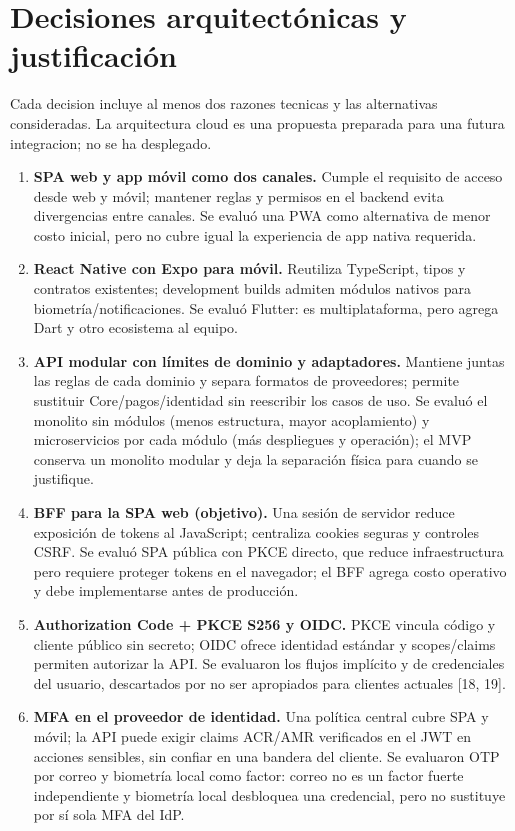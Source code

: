 \documentclass[11pt,a4paper]{report}
\begin{document}
\section{Decisiones arquitectónicas y justificación}
Cada decision incluye al menos dos razones tecnicas y las alternativas consideradas. La arquitectura cloud es una propuesta preparada para una futura integracion; no se ha desplegado.

\begin{enumerate}
\item \textbf{SPA web y app móvil como dos canales.} Cumple el requisito de acceso desde web y móvil; mantener reglas y permisos en el backend evita divergencias entre canales. Se evaluó una PWA como alternativa de menor costo inicial, pero no cubre igual la experiencia de app nativa requerida.
\item \textbf{React Native con Expo para móvil.} Reutiliza TypeScript, tipos y contratos existentes; development builds admiten módulos nativos para biometría/notificaciones. Se evaluó Flutter: es multiplataforma, pero agrega Dart y otro ecosistema al equipo.
\item \textbf{API modular con límites de dominio y adaptadores.} Mantiene juntas las reglas de cada dominio y separa formatos de proveedores; permite sustituir Core/pagos/identidad sin reescribir los casos de uso. Se evaluó el monolito sin módulos (menos estructura, mayor acoplamiento) y microservicios por cada módulo (más despliegues y operación); el MVP conserva un monolito modular y deja la separación física para cuando se justifique.
\item \textbf{BFF para la SPA web (objetivo).} Una sesión de servidor reduce exposición de tokens al JavaScript; centraliza cookies seguras y controles CSRF. Se evaluó SPA pública con PKCE directo, que reduce infraestructura pero requiere proteger tokens en el navegador; el BFF agrega costo operativo y debe implementarse antes de producción.
\item \textbf{Authorization Code + PKCE S256 y OIDC.} PKCE vincula código y cliente público sin secreto; OIDC ofrece identidad estándar y scopes/claims permiten autorizar la API. Se evaluaron los flujos implícito y de credenciales del usuario, descartados por no ser apropiados para clientes actuales [18, 19].
\item \textbf{MFA en el proveedor de identidad.} Una política central cubre SPA y móvil; la API puede exigir claims ACR/AMR verificados en el JWT en acciones sensibles, sin confiar en una bandera del cliente. Se evaluaron OTP por correo y biometría local como factor: correo no es un factor fuerte independiente y biometría local desbloquea una credencial, pero no sustituye por sí sola MFA del IdP.

\end{enumerate}
\end{document}
